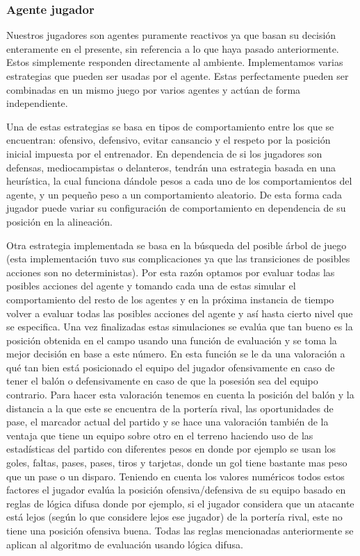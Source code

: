 \documentclass{article}
\begin{document}
\subsubsection{Agente jugador}
Nuestros jugadores son agentes puramente reactivos ya que basan su decisión enteramente en el presente, sin referencia 
a lo que haya pasado anteriormente. Estos simplemente responden directamente al ambiente. Implementamos varias 
estrategias que pueden ser usadas por el agente. Estas perfectamente pueden ser combinadas en un mismo juego por 
varios agentes y actúan de forma independiente.

Una de estas estrategias se basa en tipos de comportamiento entre los que se encuentran: ofensivo, defensivo, evitar 
cansancio y el respeto por la posición inicial impuesta por el entrenador. En dependencia de si los jugadores son 
defensas, mediocampistas o delanteros, tendrán una estrategia basada en una heurística, la cual funciona dándole 
pesos a cada uno de los comportamientos del agente, y un pequeño peso a un comportamiento aleatorio. De esta forma 
cada jugador puede variar su configuración de comportamiento en dependencia de su posición en la alineación.

Otra estrategia implementada se basa en la búsqueda del posible árbol de juego (esta implementación tuvo sus complicaciones 
ya que las transiciones de posibles acciones son no deterministas). Por esta razón 
optamos por evaluar todas las posibles acciones del agente y tomando cada una de estas simular el comportamiento del 
resto de los agentes y en la próxima instancia de tiempo volver a evaluar todas las posibles acciones del agente y así 
hasta cierto nivel que se especifica. Una vez finalizadas estas simulaciones se evalúa que tan bueno es la posición 
obtenida en el campo usando una función de evaluación y se toma la mejor decisión en base a este número. En esta 
función se le da una valoración a qué tan bien está posicionado el equipo del jugador ofensivamente en caso de tener 
el balón o defensivamente en caso de que la posesión sea del equipo contrario. Para hacer esta valoración tenemos en 
cuenta la posición del balón y la distancia a la que este se encuentra de la portería rival, las oportunidades de 
pase, el marcador actual del partido y se hace una valoración también de la ventaja que tiene un equipo sobre otro 
en el terreno haciendo uso de las estadísticas del partido con diferentes pesos en donde por ejemplo se usan los 
goles, faltas, pases, pases, tiros y tarjetas, donde un gol tiene bastante mas peso que un pase  o un disparo. 
Teniendo en cuenta los valores numéricos todos estos factores el jugador evalúa la posición ofensiva/defensiva de 
su equipo basado en reglas de lógica difusa donde por ejemplo, si el jugador considera que un atacante está lejos 
(según lo que considere lejos ese jugador) de la portería rival, este no tiene una posición ofensiva buena.
Todas las reglas mencionadas anteriormente se aplican al algoritmo de evaluación usando lógica difusa.
\end{document}

